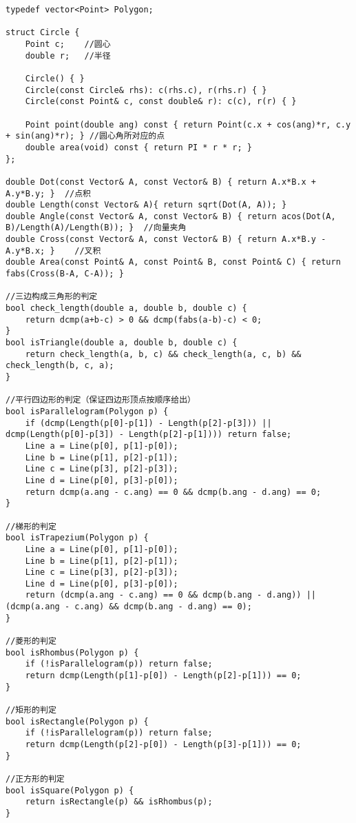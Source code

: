 \documentclass[twocolumn,a4]{article}
\begin{document}
\begin{lstlisting}
typedef vector<Point> Polygon;
 
struct Circle {
    Point c;    //圆心
    double r;   //半径
 
    Circle() { }
    Circle(const Circle& rhs): c(rhs.c), r(rhs.r) { }
    Circle(const Point& c, const double& r): c(c), r(r) { }
 
    Point point(double ang) const { return Point(c.x + cos(ang)*r, c.y + sin(ang)*r); } //圆心角所对应的点
    double area(void) const { return PI * r * r; }
};
 
double Dot(const Vector& A, const Vector& B) { return A.x*B.x + A.y*B.y; }  //点积
double Length(const Vector& A){ return sqrt(Dot(A, A)); }
double Angle(const Vector& A, const Vector& B) { return acos(Dot(A, B)/Length(A)/Length(B)); }  //向量夹角
double Cross(const Vector& A, const Vector& B) { return A.x*B.y - A.y*B.x; }    //叉积
double Area(const Point& A, const Point& B, const Point& C) { return fabs(Cross(B-A, C-A)); }
 
//三边构成三角形的判定
bool check_length(double a, double b, double c) {
    return dcmp(a+b-c) > 0 && dcmp(fabs(a-b)-c) < 0;
}
bool isTriangle(double a, double b, double c) {
    return check_length(a, b, c) && check_length(a, c, b) && check_length(b, c, a);
}
 
//平行四边形的判定（保证四边形顶点按顺序给出）
bool isParallelogram(Polygon p) {
    if (dcmp(Length(p[0]-p[1]) - Length(p[2]-p[3])) || dcmp(Length(p[0]-p[3]) - Length(p[2]-p[1]))) return false;
    Line a = Line(p[0], p[1]-p[0]);
    Line b = Line(p[1], p[2]-p[1]);
    Line c = Line(p[3], p[2]-p[3]);
    Line d = Line(p[0], p[3]-p[0]);
    return dcmp(a.ang - c.ang) == 0 && dcmp(b.ang - d.ang) == 0;
}
 
//梯形的判定
bool isTrapezium(Polygon p) {
    Line a = Line(p[0], p[1]-p[0]);
    Line b = Line(p[1], p[2]-p[1]);
    Line c = Line(p[3], p[2]-p[3]);
    Line d = Line(p[0], p[3]-p[0]);
    return (dcmp(a.ang - c.ang) == 0 && dcmp(b.ang - d.ang)) || (dcmp(a.ang - c.ang) && dcmp(b.ang - d.ang) == 0);
}
 
//菱形的判定
bool isRhombus(Polygon p) {
    if (!isParallelogram(p)) return false;
    return dcmp(Length(p[1]-p[0]) - Length(p[2]-p[1])) == 0;
}
 
//矩形的判定
bool isRectangle(Polygon p) {
    if (!isParallelogram(p)) return false;
    return dcmp(Length(p[2]-p[0]) - Length(p[3]-p[1])) == 0;
}
 
//正方形的判定
bool isSquare(Polygon p) {
    return isRectangle(p) && isRhombus(p);
}
 

\end{lstlisting}
\end{document}
